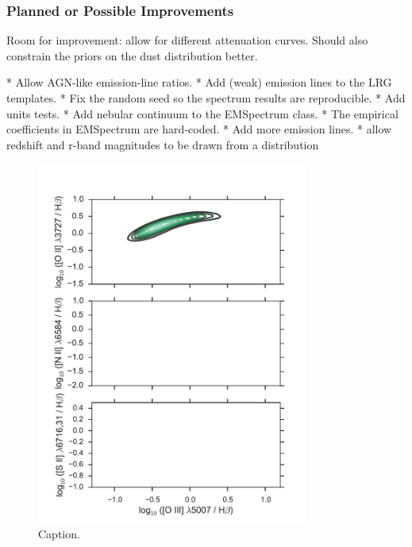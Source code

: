 \documentclass[12pt]{article}
\newcommand{\oiilam}{[O~{\sc ii}]~\ensuremath{\lambda\lambda3726,29}}
\begin{document}
\subsubsection{Planned or Possible Improvements}

Room for improvement: allow for different attenuation curves.  Should also
constrain the priors on the dust distribution better.

* Allow AGN-like emission-line ratios.
* Add (weak) emission lines to the LRG templates.
* Fix the random seed so the spectrum results are reproducible.
* Add units tests.
* Add nebular continuum to the EMSpectrum class.
* The empirical coefficients in EMSpectrum are hard-coded.
* Add more emission lines.
* allow redshift and r-band magnitudes to be drawn from a distribution

\begin{figure}
\centering
\includegraphics[width=0.8\textwidth]{figures/oiiihb.pdf}
\caption{Caption. \label{fig:oiiihb}}
\end{figure}

\end{document}
